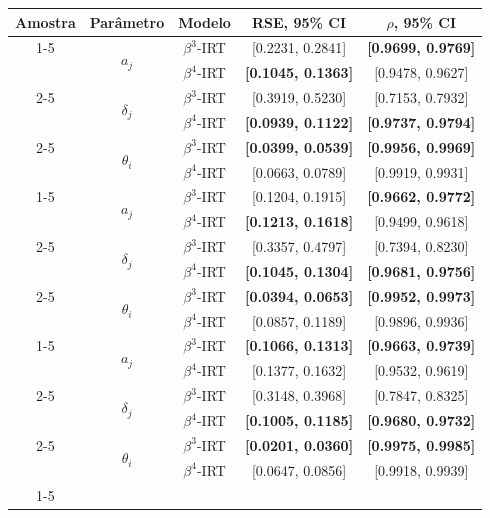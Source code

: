 


{\color{blue}
\begin{table}[!htb]
\begin{tabular}{ccccc}
\toprule
Amostra & Parâmetro & Modelo & RSE, 95\% CI & $\rho$, 95\% CI \\
\cline{1-5}
\multirow[c]{6}{*}{$N = 100$, $M = 100$} & \multirow[c]{2}{*}{$a_j$} & $\beta^3$-\gls{IRT} & [0.2231, 0.2841] & \textbf{[0.9699, 0.9769]} \\
 &  & $\beta^4$-\gls{IRT} & \textbf{[0.1045, 0.1363]} & [0.9478, 0.9627] \\
\cline{2-5}
 & \multirow[c]{2}{*}{$\delta_j$} & $\beta^3$-\gls{IRT} & [0.3919, 0.5230] & [0.7153, 0.7932] \\
 &  & $\beta^4$-\gls{IRT} & \textbf{[0.0939, 0.1122]} & \textbf{[0.9737, 0.9794]} \\
\cline{2-5}
 & \multirow[c]{2}{*}{$\theta_i$} & $\beta^3$-\gls{IRT} & \textbf{[0.0399, 0.0539]} & \textbf{[0.9956, 0.9969]} \\
 &  & $\beta^4$-\gls{IRT} & [0.0663, 0.0789] & [0.9919, 0.9931] \\
\cline{1-5} \cline{2-5}
\multirow[c]{6}{*}{$N = 100, M = 20$} & \multirow[c]{2}{*}{$a_j$} & $\beta^3$-\gls{IRT} & [0.1204, 0.1915] & \textbf{[0.9662, 0.9772]} \\
 &  & $\beta^4$-\gls{IRT} & \textbf{[0.1213, 0.1618]} & [0.9499, 0.9618] \\
\cline{2-5}
 & \multirow[c]{2}{*}{$\delta_j$} & $\beta^3$-\gls{IRT} & [0.3357, 0.4797] & [0.7394, 0.8230] \\
 &  & $\beta^4$-\gls{IRT} &\textbf{[0.1045, 0.1304]} & \textbf{[0.9681, 0.9756]} \\
\cline{2-5}
 & \multirow[c]{2}{*}{$\theta_i$} & $\beta^3$-\gls{IRT} & \textbf{[0.0394, 0.0653]} & \textbf{[0.9952, 0.9973]} \\
 &  & $\beta^4$-\gls{IRT} & [0.0857, 0.1189] & [0.9896, 0.9936] \\
\cline{1-5} \cline{2-5}
\multirow[c]{6}{*}{$N = 300, M = 50$} & \multirow[c]{2}{*}{$a_j$} & $\beta^3$-\gls{IRT} & \textbf{[0.1066, 0.1313]} & \textbf{[0.9663, 0.9739]} \\
 &  & $\beta^4$-\gls{IRT} & [0.1377, 0.1632] & [0.9532, 0.9619] \\
\cline{2-5}
 & \multirow[c]{2}{*}{$\delta_j$} & $\beta^3$-\gls{IRT} & [0.3148, 0.3968] & [0.7847, 0.8325] \\
 &  & $\beta^4$-\gls{IRT} & \textbf{[0.1005, 0.1185]} &\textbf{ [0.9680, 0.9732]} \\
\cline{2-5}
 & \multirow[c]{2}{*}{$\theta_i$} & $\beta^3$-\gls{IRT} & \textbf{[0.0201, 0.0360]} &\textbf{ [0.9975, 0.9985]} \\
 &  & $\beta^4$-\gls{IRT} & [0.0647, 0.0856] & [0.9918, 0.9939] \\
\cline{1-5}
\end{tabular}
    

\end{table}}
